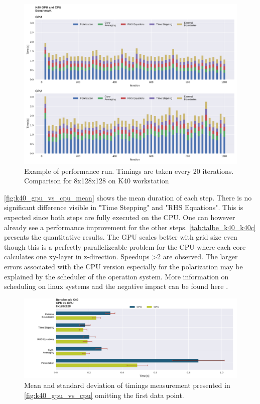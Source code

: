 \documentclass[master.tex]{subfiles}
\begin{document}
\begin{figure}[!hbtp]
    \centering
    \includegraphics[width=\linewidth]{pdfs/k40CPUvsGPU_full.pdf}
    \caption{\small Example of performance run. Timings are taken every 20 iterations. Comparison for 8x128x128 on K40 workstation}
    \label{fig:k40_gpu_vs_cpu}
\end{figure}

\autoref{fig:k40_gpu_vs_cpu_mean} shows the mean duration of each step. There is no significant difference visible in "Time Stepping" and "RHS Equations". This is expected since both steps are fully executed on the CPU. One can however already see a performance improvement for the other steps. \autoref{tab:talbe_k40_k40c} presents the quantitative results. The GPU scales better with grid size even though this is a perfectly parallelizeable problem for the CPU where each core calculates one xy-layer in z-direction. Speedups >2 are observed.
The larger errors associated with the CPU version especially for the polarization may be explained by the scheduler of the operation system. More information on scheduling on linux systems and the negative impact can be found here \cite{Scheduling-Linux}.

\begin{figure}[!hbtp]
    \centering
    \includegraphics[width=\linewidth]{pdfs/k40CPUvsGPU_means.pdf}
    \caption{\small Mean and standard deviation of timings measurement presented in \autoref{fig:k40_gpu_vs_cpu} omitting the first data point.}
    \label{fig:k40_gpu_vs_cpu_mean}
\end{figure}
\end{document}
